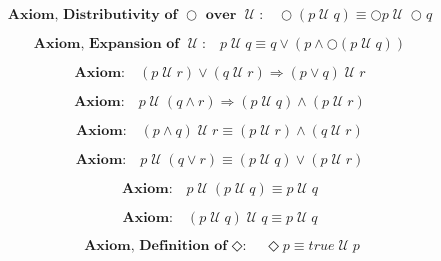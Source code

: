 \documentclass[fleqn, leqno]{article}
\newcommand{\until}{\;\mathcal{U}\;}
\newcommand{\spacer}{\vspace{-30pt}}
\begin{document}
\spacer

\begin{equation}\label{E:distNextUntil}
\textbf{Axiom, Distributivity of $\bigcirc$ over $\until$:}\quad \bigcirc (p \until q) \equiv \bigcirc p \until \bigcirc q
\end{equation}

\spacer

\begin{equation}\label{E:expansionUntil}
\textbf{Axiom, Expansion of $\until$:}\quad p \until q \equiv q \lor (p \land \bigcirc (p \until q))
\end{equation}

\spacer

\begin{equation}\label{E:untilOrImp}
\textbf{Axiom:}\quad (p \until r) \lor (q \until r) \Rightarrow (p \lor q) \until r
\end{equation}

\spacer

\begin{equation}\label{E:untilAndImp}
\textbf{Axiom:}\quad p \until (q \land r) \Rightarrow (p \until q) \land (p \until r)
\end{equation}

\spacer

\begin{equation}\label{E:untilAndEquiv}
\textbf{Axiom:}\quad (p \land q) \until r \equiv (p \until r) \land (q \until r)
\end{equation}

\spacer

\begin{equation}\label{E:untilOrEquiv}
\textbf{Axiom:}\quad p \until (q \lor r) \equiv (p \until q) \lor (p \until r)
\end{equation}

\spacer

\begin{equation}\label{E:untilIdem}
\textbf{Axiom:}\quad p \until (p \until q) \equiv p \until q
\end{equation}

\spacer

\begin{equation}\label{E:untilIdemR}
\textbf{Axiom:}\quad (p \until q) \until q \equiv p \until q
\end{equation}

\spacer

\begin{equation}\label{E:defEvent}
\textbf{Axiom, Definition of $\Diamond$:}\quad \Diamond p \equiv true \until p
\end{equation}
\end{document}
